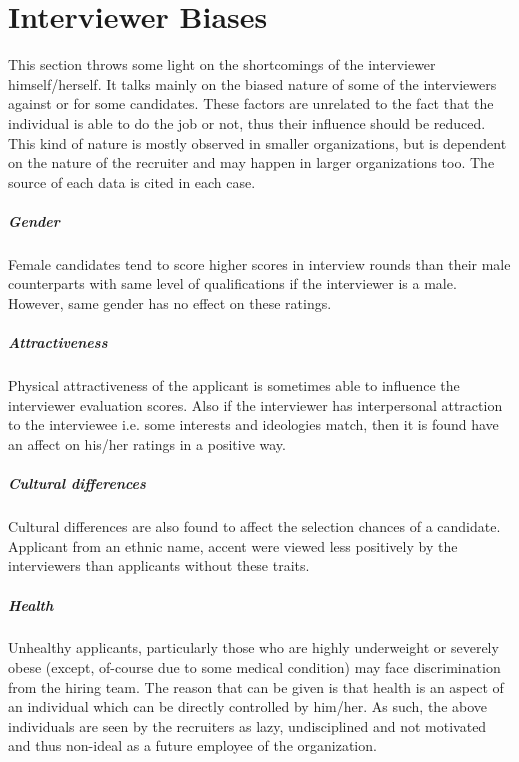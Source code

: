\documentclass[a4paper,12pt]{report}
\begin{document}
\chapter{Interviewer Biases}
This section throws some light on the shortcomings of the interviewer himself/herself. It talks mainly on the
biased nature of some of the interviewers against or for some candidates. These factors are unrelated to the fact that 
the individual is able to do the job or not, thus their influence should be reduced. This kind of nature is mostly observed in
smaller organizations, but is dependent on the nature of the recruiter and may happen in larger organizations too.
The source of each data is cited in each case.
\paragraph{Gender}
Female candidates tend to score higher scores in interview rounds than their male counterparts with same
level of qualifications if the interviewer is a male\cite{bias}. However, same gender has no effect on these ratings.
\paragraph{Attractiveness}
Physical attractiveness of the applicant is sometimes able to influence the interviewer evaluation scores.
Also if the interviewer has interpersonal attraction\cite{interpersonal} to the interviewee i.e. some interests and ideologies match,
then it is found have an affect on his/her ratings in a positive way.
\paragraph{Cultural differences}
Cultural differences are also found to affect the selection chances of a candidate\cite{bias}. Applicant from 
an ethnic name, accent were viewed less positively by the interviewers than applicants without these traits.
\paragraph{Health}
Unhealthy applicants, particularly those who are highly underweight or severely obese (except, of-course due to some medical condition)
may face discrimination from the hiring team. The reason that can be given is that health is an aspect of an individual
 which can be directly controlled by him/her. As such, the above individuals are seen by the recruiters as lazy, undisciplined and
not motivated and thus non-ideal as a future employee of the organization.
\end{document}
